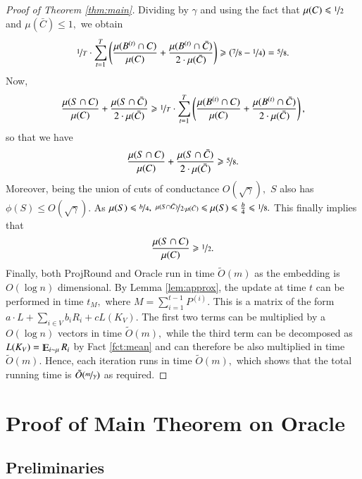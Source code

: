 \documentclass[twoside,leqno,twocolumn]{article}
\newcommand{\nfrac}{\nicefrac}
\renewcommand{\mathbb}{\varmathbb}
\renewcommand{\leq}{\leqslant}
\renewcommand{\geq}{\geqslant}
\newcommand{\Esymb}{\mathbb{E}}
\DeclareMathOperator*{\E}{\Esymb}
\numberwithin{equation}{section}
\begin{document}
\begin{proof}[Proof of Theorem \ref{thm:main}]
Dividing by $\gamma$ and using the fact that $\mu(C) \leq \nfrac{1}{2}$ and $\mu(\bar{C}) \leq 1,$ we obtain
$$
\nfrac{1}{T} \cdot \sum_{t=1}^T  \left(\frac{\mu(B^{(t)} \cap C)}{\mu(C)} + \frac{\mu(B^{(t)} \cap \bar{C})}{2 \cdot \mu(\bar{C})} \right) \geq \left(\nfrac{7}{8} - \nfrac{1}{4}\right)=\nfrac{5}{8}. 
$$
Now,
$$
\frac{\mu(S \cap C)}{\mu(C)} + \frac{\mu(S\cap \bar{C})}{2 \cdot \mu(\bar{C})} \geq \nfrac{1}{T} \cdot \sum_{t=1}^T  \left(\frac{\mu(B^{(t)} \cap C)}{\mu(C)} + \frac{\mu(B^{(t)} \cap \bar{C})}{2 \cdot \mu(\bar{C})} \right), 
$$
so that we have
$$
\frac{\mu(S \cap C)}{\mu(C)} + \frac{\mu(S\cap \bar{C})}{2 \cdot \mu(\bar{C})} \geq \nfrac{5}{8}.
$$
Moreover, being the union of cuts of conductance $O(\sqrt{\gamma}),$ $S$ also has $\phi(S) \leq O(\sqrt{\gamma}).$
As $\mu(S) \leq \nfrac{b}{4},$ $\nfrac{\mu(S\cap \bar{C})}{2 \cdot \mu(\bar{C})} \leq \mu(S) \leq \frac{b}{4} \leq \nfrac{1}{8}.$ This finally implies that
$$
\frac{\mu(S \cap C)}{\mu(C)} \geq \nfrac{1}{2}.
$$
Finally,  both {\sc ProjRound} and {\sc Oracle} run in time $\tilde{O}(m)$ as the embedding is $O(\log n)$ dimensional. By Lemma \ref{lem:approx}, the update at time $t$ can be performed in time $t_M,$ where $M=\sum_{i=1}^{t-1} P^{(i)}.$ This is a matrix of the form $a \cdot L + \sum_{i \in V} b_i R_i + c L(K_V).$ The first two terms can be multiplied by a $O(\log n)$ vectors in time $\tilde{O}(m),$ while the third term can be decomposed as $L(K_V) = \E_{i \sim \mu} R_i$ by Fact \ref{fct:mean} and can therefore be also multiplied in time $\tilde{O}(m).$
Hence, each iteration runs in time $\tilde{O}(m),$ which shows that the total running time is $\tilde{O}(\nfrac{m}{\gamma})$ as required.







\end{proof}



\section{Proof of Main Theorem on {\sc Oracle}} \label{sec:mp}


\subsection{Preliminaries}
\end{document}
